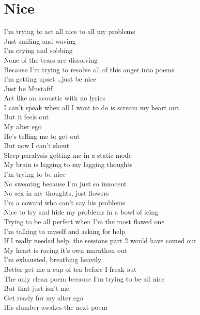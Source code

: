 \documentclass[12pt, b5paper, oneside]{book}
\begin{document}
\section{Nice}
I'm trying to act all nice to all my problems
\\Just smiling and waving
\\I'm crying and sobbing
\\None of the tears are dissolving
\\Because I'm trying to resolve all of this anger into poems
\\I'm getting upset \dots just be nice
\\Just be Mustafif
\\Act like an acoustic with no lyrics
\\I can't speak when all I want to do is scream my heart out
\\But it feels out
\\My alter ego
\\He's telling me to get out
\\But now I can't shout
\\Sleep paralysis getting me in a static mode
\\My brain is lagging to my lagging thoughts
\\I'm trying to be nice
\\No swearing because I'm just so innocent
\\No sex in my thoughts, just flowers
\\I'm a coward who can't say his problems
\\Nice to try and hide my problems in a bowl of icing
\\Trying to be all perfect when I'm the most flawed one
\\I'm talking to myself and asking for help
\\If I really needed help, the sessions part 2 would have comed out
\\My heart is racing it's own marathon out
\\I'm exhausted, breathing heavily
\\Better get me a cup of tea before I freak out
\\The only clean poem because I'm trying to be all nice
\\But that just isn't me
\\Get ready for my alter ego
\\His slumber awakes the next poem 
\newpage
\end{document}
